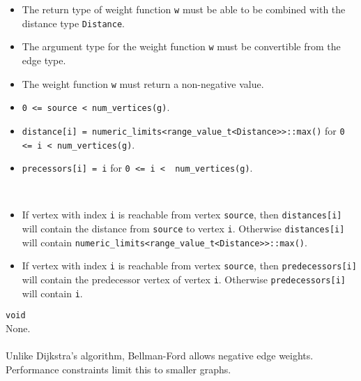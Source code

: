 \begin{itemdescr}
      \pnum\mandates
            \begin{itemize}
                  \item
                        The return type of weight function \lstinline{w} must be able to
                        be combined with the distance type \lstinline{Distance}.
                  \item
                        The argument type for the weight function \lstinline{w} must be convertible from the edge type.
                  \item
                        The weight function \lstinline{w} must return a non-negative value.
            \end{itemize}
      \pnum\preconditions
            \begin{itemize}
                  \item
                        \lstinline{0 <= source < num_vertices(g)}. 
                        \\ 
                  \item
                        \lstinline{distance[i] = numeric_limits<range_value_t<Distance>>::max()}
                        for \lstinline{0 <= i < num_vertices(g)}.  
                        \\ 
                  \item
                        \lstinline{precessors[i] = i} for \lstinline{0 <= i <  num_vertices(g)}.
            \end{itemize}
      \pnum\effects \\
      \pnum\result
            \begin{itemize}
                  \item
                        If vertex with index \lstinline{i} is reachable from vertex \lstinline{source}, then
                        \lstinline{distances[i]} will contain the distance from \lstinline{source} to vertex
                        \lstinline{i}.  Otherwise \lstinline{distances[i]} will contain
                        \lstinline{numeric_limits<range_value_t<Distance>>::max()}.
                  \item
                        If vertex with index \lstinline{i} is reachable
                        from vertex \lstinline{source}, then \lstinline{predecessors[i]} will contain the
                        predecessor vertex of vertex \lstinline{i}. Otherwise \lstinline{predecessors[i]} will contain
                        \lstinline{i}.
            \end{itemize}
      \pnum\returns \lstinline{void} \\
      \pnum\throws None. \\
      \pnum\complexity \\
      \pnum\remarks Unlike Dijkstra's algorithm, Bellman-Ford allows negative edge weights. Performance constraints limit this to smaller graphs. \\
      \pnum\errors
\end{itemdescr}


